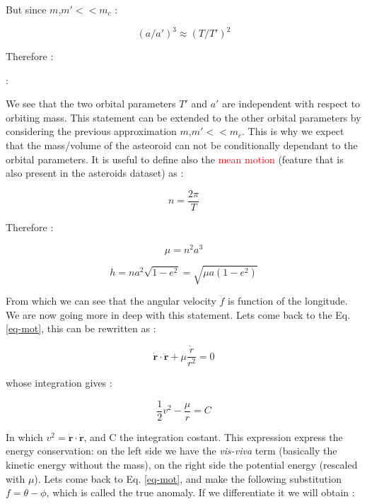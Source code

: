\documentclass[12pt,%
               a4paper,%
               oneside,openany,%
               titlepage,%
               headinclude,footinclude,%
               BCOR5mm,%
               cleardoublepage=empty,%
               tablecaptionabove,%
               floatperchapter,
               ]{scrreprt}                 %
\begin{document}
But since $m$,$m'<<m_{c}$ \cite{murray1999solar}:

\begin{equation}
(a/a')^{3}\approx(T/T')^{2}
\end{equation}

Therefore \cite{murray1999solar}:

\cite{murray1999solar}:

We see that the two orbital parameters $T'$ and $a'$ are independent with respect to orbiting mass. This statement can be extended to the other orbital parameters by considering the previous approximation $m$,$m'<<m_{c}$. This is why we expect that the mass/volume of the asteoroid can not be conditionally dependant to the orbital parameters. It is useful to define also the \textcolor{red}{mean motion} (feature that is also present in the asteroids dataset) as \cite{murray1999solar}:

\begin{equation}
n=\frac{2\pi}{T}
\end{equation}

Therefore \cite{murray1999solar}:

\begin{equation}
\mu=n^{2}a^{3}
\end{equation}

\begin{equation}
h=na^{2}\sqrt{1-e^{2}}=\sqrt{\mu a(1-e^{2})}
\label{eq_h}
\end{equation}

From which we can see that the angular velocity $\ddot{f}$ is function of the longitude. We are now going more in deep with this statement. Lets come back to the Eq. \ref{eq-mot}, this can be rewritten as \cite{murray1999solar}:

\begin{equation}
\dot{\textbf{r}}\cdot\ddot{\textbf{r}}+\mu\dfrac{\dot{r}}{r^{2}}=0
\end{equation}

whose integration gives \cite{murray1999solar}:

\begin{equation}
\frac{1}{2}v^{2}-\frac{\mu}{r}=C
\label{energy_cons}
\end{equation}

In which $v^{2}=\dot{\textbf{r}}\cdot\dot{\textbf{r}}$, and C the integration costant. This expression express the energy conservation: on the left side we have the \textit{vis-viva} term (basically the kinetic energy without the mass), on the right side the potential energy (rescaled with $\mu$). Lets come back to Eq. \ref{eq-mot}, and make the following substitution $f=\theta-\phi$, which is called the true anomaly. If we differentiate it we will obtain \cite{murray1999solar}:
\end{document}
